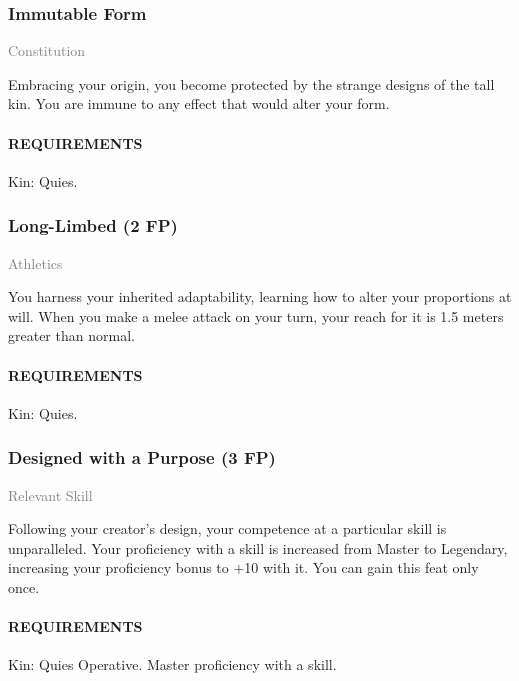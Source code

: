     \subsubsection{Immutable Form} \label{feat::immutableform}
    \small{\textcolor{gray}{Constitution}}

    \normalsize
    Embracing your origin, you become protected by the strange designs of the tall kin.
    You are immune to any effect that would alter your form.
    \paragraph{REQUIREMENTS} Kin: Quies.

    \subsubsection{Long-Limbed (2 FP)} \label{feat::longlimbed}
    \small{\textcolor{gray}{Athletics}}

    \normalsize
    You harness your inherited adaptability, learning how to alter your proportions at will.
    When you make a melee attack on your turn, your reach for it is 1.5 meters greater than normal.
    \paragraph{REQUIREMENTS} Kin: Quies.

    \subsubsection{Designed with a Purpose (3 FP)} \label{feat::designedwithapurpose}
    \small{\textcolor{gray}{Relevant Skill}}

    \normalsize
    Following your creator's design, your competence at a particular skill is unparalleled.
    Your proficiency with a skill is increased from Master to Legendary, increasing your proficiency bonus to +10 with it.
    You can gain this feat only once.
    \paragraph{REQUIREMENTS} Kin: Quies Operative. Master proficiency with a skill.
